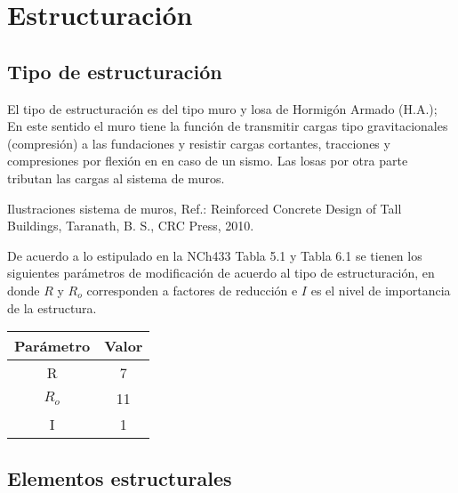 \newpage
\section{Estructuración}

\subsection{Tipo de estructuración}

El tipo de estructuración es del tipo muro y losa de Hormigón Armado (H.A.); En este sentido el muro tiene la función de transmitir cargas tipo gravitacionales (compresión) a las fundaciones y resistir cargas cortantes, tracciones y compresiones por flexión en en caso de un sismo. Las losas por otra parte tributan las cargas al sistema de muros.


\begin{images}{Ilustraciones sistema de muros, Ref.: Reinforced Concrete Design of Tall Buildings, Taranath, B. S., CRC Press, 2010.}
\end{images}

De acuerdo a lo estipulado en la NCh433 Tabla 5.1 y Tabla 6.1 se tienen los siguientes parámetros de modificación de acuerdo al tipo de estructuración, en donde $R$ y $R_o$ corresponden a factores de reducción e $I$ es el nivel de importancia de la estructura.

\begin{table}[H]
  \centering
    \begin{tabular}{|c|c|}
    \hline
    \textbf{Parámetro} & \textbf{Valor} \bigstrut\\
    \hline
    R     & 7 \bigstrut\\
    \hline
    $R_o$ & 11 \bigstrut\\
    \hline
    I     & 1 \bigstrut\\
    \hline
    \end{tabular}%

\end{table}%

\subsection{Elementos estructurales}

